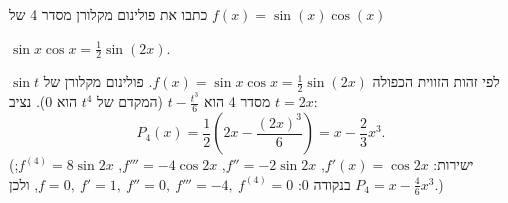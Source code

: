 
\begin{question}
כתבו את פולינום מקלורן מסדר 4 של $f(x)=\sin(x)\cos(x)$
\end{question}

\begin{hint}
$\sin x\cos x=\frac12\sin(2x)$.
\end{hint}

\begin{solution}
לפי זהות הזווית הכפולה $f(x)=\sin x\cos x=\frac12\sin(2x)$. פולינום מקלורן של $\sin t$ מסדר 4 הוא $t-\frac{t^3}{6}$ (המקדם של $t^4$ הוא $0$). נציב $t=2x$:
\[ P_4(x)=\frac12\left(2x-\frac{(2x)^3}{6}\right)=\boxed{x-\frac{2}{3}x^3}. \]
(ישירות: $f'(x)=\cos2x$, $f''=-2\sin2x$, $f'''=-4\cos2x$, $f^{(4)}=8\sin2x$; בנקודה $0$: $f=0,\ f'=1,\ f''=0,\ f'''=-4,\ f^{(4)}=0$, ולכן $P_4=x-\frac{4}{6}x^3$.)
\end{solution}
